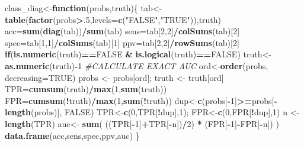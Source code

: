 \documentclass[
]{article}
\newenvironment{Shaded}{\begin{snugshade}}{\end{snugshade}}
\newcommand{\CommentTok}[1]{\textcolor[rgb]{0.56,0.35,0.01}{\textit{#1}}}
\newcommand{\ControlFlowTok}[1]{\textcolor[rgb]{0.13,0.29,0.53}{\textbf{#1}}}
\newcommand{\DataTypeTok}[1]{\textcolor[rgb]{0.13,0.29,0.53}{#1}}
\newcommand{\DecValTok}[1]{\textcolor[rgb]{0.00,0.00,0.81}{#1}}
\newcommand{\KeywordTok}[1]{\textcolor[rgb]{0.13,0.29,0.53}{\textbf{#1}}}
\newcommand{\NormalTok}[1]{#1}
\newcommand{\OperatorTok}[1]{\textcolor[rgb]{0.81,0.36,0.00}{\textbf{#1}}}
\newcommand{\OtherTok}[1]{\textcolor[rgb]{0.56,0.35,0.01}{#1}}
\newcommand{\StringTok}[1]{\textcolor[rgb]{0.31,0.60,0.02}{#1}}
\begin{document}
\begin{Shaded}
\begin{Highlighting}[]
\NormalTok{class_diag<-}\ControlFlowTok{function}\NormalTok{(probs,truth)\{}
\NormalTok{ tab<-}\KeywordTok{table}\NormalTok{(}\KeywordTok{factor}\NormalTok{(probs}\OperatorTok{>}\NormalTok{.}\DecValTok{5}\NormalTok{,}\DataTypeTok{levels=}\KeywordTok{c}\NormalTok{(}\StringTok{"FALSE"}\NormalTok{,}\StringTok{"TRUE"}\NormalTok{)),truth)}
\NormalTok{ acc=}\KeywordTok{sum}\NormalTok{(}\KeywordTok{diag}\NormalTok{(tab))}\OperatorTok{/}\KeywordTok{sum}\NormalTok{(tab)}
\NormalTok{ sens=tab[}\DecValTok{2}\NormalTok{,}\DecValTok{2}\NormalTok{]}\OperatorTok{/}\KeywordTok{colSums}\NormalTok{(tab)[}\DecValTok{2}\NormalTok{]}
\NormalTok{ spec=tab[}\DecValTok{1}\NormalTok{,}\DecValTok{1}\NormalTok{]}\OperatorTok{/}\KeywordTok{colSums}\NormalTok{(tab)[}\DecValTok{1}\NormalTok{]}
\NormalTok{ ppv=tab[}\DecValTok{2}\NormalTok{,}\DecValTok{2}\NormalTok{]}\OperatorTok{/}\KeywordTok{rowSums}\NormalTok{(tab)[}\DecValTok{2}\NormalTok{]}
 \ControlFlowTok{if}\NormalTok{(}\KeywordTok{is.numeric}\NormalTok{(truth)}\OperatorTok{==}\OtherTok{FALSE} \OperatorTok{&}\StringTok{ }\KeywordTok{is.logical}\NormalTok{(truth)}\OperatorTok{==}\OtherTok{FALSE}\NormalTok{) truth<-}\KeywordTok{as.numeric}\NormalTok{(truth)}\OperatorTok{-}\DecValTok{1}
 \CommentTok{#CALCULATE EXACT AUC}
\NormalTok{ ord<-}\KeywordTok{order}\NormalTok{(probs, }\DataTypeTok{decreasing=}\OtherTok{TRUE}\NormalTok{)}
\NormalTok{ probs <-}\StringTok{ }\NormalTok{probs[ord]; truth <-}\StringTok{ }\NormalTok{truth[ord]}
\NormalTok{ TPR=}\KeywordTok{cumsum}\NormalTok{(truth)}\OperatorTok{/}\KeywordTok{max}\NormalTok{(}\DecValTok{1}\NormalTok{,}\KeywordTok{sum}\NormalTok{(truth))}
\NormalTok{ FPR=}\KeywordTok{cumsum}\NormalTok{(}\OperatorTok{!}\NormalTok{truth)}\OperatorTok{/}\KeywordTok{max}\NormalTok{(}\DecValTok{1}\NormalTok{,}\KeywordTok{sum}\NormalTok{(}\OperatorTok{!}\NormalTok{truth))}
\NormalTok{ dup<-}\KeywordTok{c}\NormalTok{(probs[}\OperatorTok{-}\DecValTok{1}\NormalTok{]}\OperatorTok{>=}\NormalTok{probs[}\OperatorTok{-}\KeywordTok{length}\NormalTok{(probs)], }\OtherTok{FALSE}\NormalTok{)}
\NormalTok{ TPR<-}\KeywordTok{c}\NormalTok{(}\DecValTok{0}\NormalTok{,TPR[}\OperatorTok{!}\NormalTok{dup],}\DecValTok{1}\NormalTok{); FPR<-}\KeywordTok{c}\NormalTok{(}\DecValTok{0}\NormalTok{,FPR[}\OperatorTok{!}\NormalTok{dup],}\DecValTok{1}\NormalTok{)}
\NormalTok{ n <-}\StringTok{ }\KeywordTok{length}\NormalTok{(TPR)}
\NormalTok{ auc<-}\StringTok{ }\KeywordTok{sum}\NormalTok{( ((TPR[}\OperatorTok{-}\DecValTok{1}\NormalTok{]}\OperatorTok{+}\NormalTok{TPR[}\OperatorTok{-}\NormalTok{n])}\OperatorTok{/}\DecValTok{2}\NormalTok{) }\OperatorTok{*}\StringTok{ }\NormalTok{(FPR[}\OperatorTok{-}\DecValTok{1}\NormalTok{]}\OperatorTok{-}\NormalTok{FPR[}\OperatorTok{-}\NormalTok{n]) )}
 \KeywordTok{data.frame}\NormalTok{(acc,sens,spec,ppv,auc)}
\NormalTok{\} }


\end{Highlighting}
\end{Shaded}
\end{document}
